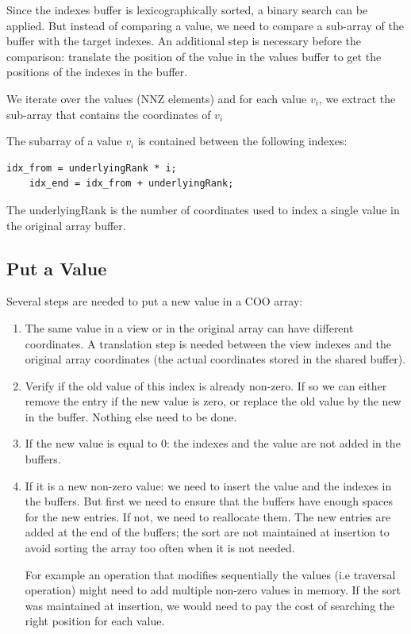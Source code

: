 Since the indexes buffer is lexicographically sorted, a binary search can be applied. But instead of comparing a value, we need to compare a sub-array of the buffer with the target indexes. An additional step is necessary before the comparison: translate the position of the value in the values buffer to get the positions of the indexes in the buffer.

We iterate over the values (NNZ elements) and for each value $v_{i}$, we extract the sub-array that contains the coordinates of $v_{i}$

The subarray of a value $v_{i}$ is contained between the following indexes: 
\begin{lstlisting}[style=nonumbers]
	idx_from = underlyingRank * i;
	idx_end = idx_from + underlyingRank;
\end{lstlisting}

The underlyingRank is the number of coordinates used to index a single value in the original array buffer.



\subsection{Put a Value}

Several steps are needed to put a new value in a COO array:
\begin{enumerate}
	\item The same value in a view or in the original array can have different coordinates. A translation step is needed between the view indexes and the original array coordinates (the actual coordinates stored in the shared buffer).
	\item Verify if the old value of this index is already non-zero. If so we can either remove the entry if the new value is zero, or replace the old value by the new in the buffer. Nothing else need to be done.
	\item If the new value is equal to 0: the indexes and the value are not added in the buffers.
	\item If it is a new non-zero value: we need to insert the value and the indexes in the buffers. But first we need to ensure that the buffers have enough spaces for the new entries. If not, we need to reallocate them. The new entries are added at the end of the buffers; the sort are not maintained at insertion to avoid sorting the array too often when it is not needed. 
	
	For example an operation that modifies sequentially the values (i.e traversal operation) might need to add multiple non-zero values in memory. If the sort was maintained at insertion, we would need to pay the cost of searching the right position for each value. 
\end{enumerate}


